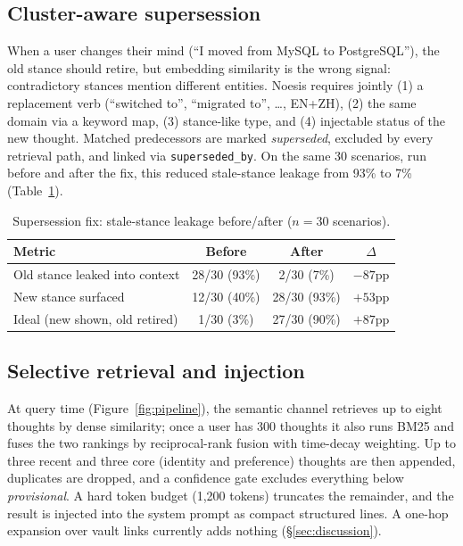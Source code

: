 \documentclass[11pt]{article}
\begin{document}
\subsection{Cluster-aware supersession}
\label{sec:supersession}

When a user changes their mind (``I moved from MySQL to PostgreSQL''), the old
stance should retire, but embedding similarity is the wrong signal:
contradictory stances mention different entities. Noesis requires jointly (1)
a replacement verb (``switched to'', ``migrated to'', \ldots, EN+ZH), (2) the
same domain via a keyword map, (3) stance-like type, and (4) injectable status
of the new thought. Matched predecessors are marked \emph{superseded},
excluded by every retrieval path, and linked via \texttt{superseded\_by}. On
the same 30 scenarios, run before and after the fix, this reduced stale-stance
leakage from 93\% to 7\% (Table~\ref{tab:supersession}).

\begin{table}[!htbp]
  \centering
  \caption{Supersession fix: stale-stance leakage before/after ($n{=}30$ scenarios).}
  \label{tab:supersession}
  \begin{tabular}{lccc}
    \toprule
    \textbf{Metric} & \textbf{Before} & \textbf{After} & \textbf{$\Delta$} \\
    \midrule
    Old stance leaked into context & 28/30 (93\%) & 2/30 (7\%)   & $-87$pp \\
    New stance surfaced            & 12/30 (40\%) & 28/30 (93\%) & $+53$pp \\
    Ideal (new shown, old retired) & 1/30 (3\%)   & 27/30 (90\%) & $+87$pp \\
    \bottomrule
  \end{tabular}
\end{table}

\subsection{Selective retrieval and injection}
\label{sec:retrieval}

At query time (Figure~\ref{fig:pipeline}), the semantic channel retrieves up
to eight thoughts by dense similarity; once a user has 300 thoughts it also
runs BM25 and fuses the two rankings by reciprocal-rank fusion with time-decay
weighting. Up to three recent and three core (identity and preference)
thoughts are then appended, duplicates are dropped, and a confidence gate
excludes everything below \emph{provisional}. A hard token budget (1{,}200
tokens) truncates the remainder, and the result is injected into the system
prompt as compact structured lines. A one-hop expansion over vault links
currently adds nothing (\S\ref{sec:discussion}).
\end{document}

